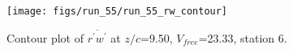 \begin{figure}[H]
\centering
\texttt{[image: figs/run\_55/run\_55\_rw\_contour]}
\caption{Contour plot of $\overline{r^\prime w^\prime}$ at $z/c$=9.50, $V_{free}$=23.33, station 6.}
\label{fig:run_55_rw_contour}
\end{figure}


